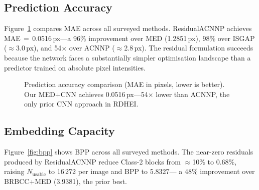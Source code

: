 \documentclass[runningheads]{llncs}
\begin{document}
\subsection{Prediction Accuracy}
Figure~\ref{fig:mae} compares MAE across all surveyed
methods. ResidualACNNP achieves MAE\,$=$\,0.0516\,px---a
96\% improvement over MED (1.2851\,px), 98\% over ISGAP
($\approx$3.0\,px), and 54$\times$ over ACNNP
($\approx$2.8\,px). The residual formulation succeeds
because the network faces a substantially simpler
optimisation landscape than a predictor trained on absolute
pixel intensities.

\begin{figure}[t]
\centering
{}
\caption{Prediction accuracy comparison (MAE in pixels,
lower is better). Our MED+CNN achieves 0.0516\,px---54$\times$
lower than ACNNP, the only prior CNN approach in RDHEI.}
\label{fig:mae}
\end{figure}

\subsection{Embedding Capacity}
Figure~\ref{fig:bpp} shows BPP across all surveyed methods.
The near-zero residuals produced by ResidualACNNP reduce
Class-2 blocks from $\approx$10\% to 0.68\%, raising
$N_\text{usable}$ to 16\,272 per image and BPP to 5.8327---
a 48\% improvement over BRBCC+MED (3.9381), the prior best.
\end{document}
